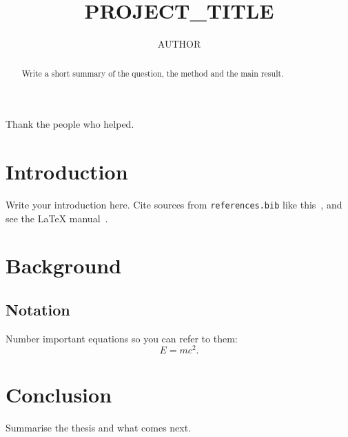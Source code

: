 \documentclass{ucbthesis}
\begin{document}
\title{{{PROJECT_TITLE}}}
\author{{{AUTHOR}}}

\maketitle
\approvalpage
\copyrightpage

\begin{abstract}
Write a short summary of the question, the method and the main result.
\end{abstract}

\begin{frontmatter}
\tableofcontents
\begin{acknowledgements}
Thank the people who helped.
\end{acknowledgements}
\end{frontmatter}

\pagestyle{headings}
\chapter{Introduction}
Write your introduction here. Cite sources from \texttt{references.bib} like
this~\cite{einstein1905}, and see the \LaTeX{} manual~\cite{lamport1994}.

\chapter{Background}
\section{Notation}
Number important equations so you can refer to them:
\begin{equation}
  E = mc^2 . \label{eq:energy}
\end{equation}

\chapter{Conclusion}
Summarise the thesis and what comes next.



\end{document}
